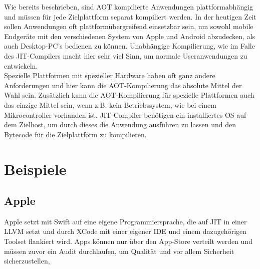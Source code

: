 Wie bereits beschrieben, sind \ac{AOT} kompilierte Anwendungen plattformabhängig und müssen für jede Zielplattform separat kompiliert werden. In der heutigen Zeit sollen Anwendungen oft plattformübergreifend einsetzbar sein, um sowohl mobile Endgeräte mit den verschiedenen System von Apple und Android abzudecken, als auch Desktop-PC's bedienen zu können. Unabhängige Kompilierung, wie im Falle des \ac{JIT}-Compilers macht hier sehr viel Sinn, um normale Useranwendungen zu entwickeln. \\
Spezielle Plattformen mit spezieller Hardware haben oft ganz andere Anforderungen und hier kann die \ac{AOT}-Kompilierung das absolute Mittel der Wahl sein. Zusätzlich kann die \ac{AOT}-Kompilierung für spezielle Plattformen auch das einzige Mittel sein, wenn z.B. kein Betriebssystem, wie bei einem Mikrocontroller vorhanden ist. \ac{JIT}-Compiler benötigen ein installiertes \ac{OS} auf dem Zielhost, um durch dieses die Anwendung ausführen zu lassen und den Bytecode für die Zielplattform zu kompilieren. 

\section{Beispiele}
\subsection{Apple}
Apple setzt mit Swift auf eine eigene Programmiersprache, die auf \ac{JIT} in einer \ac{LLVM} setzt und durch XCode mit einer eigener \ac{IDE} und einem dazugehörigen Toolset flankiert wird. Apps können nur über den App-Store verteilt werden und müssen zuvor ein Audit durchlaufen, um Qualität und vor allem Sicherheit sicherzustellen, \cite[vgl. Apple Inc. 2022, Webseite abgerufen am 03.12.2022]{swift_compiler} 

